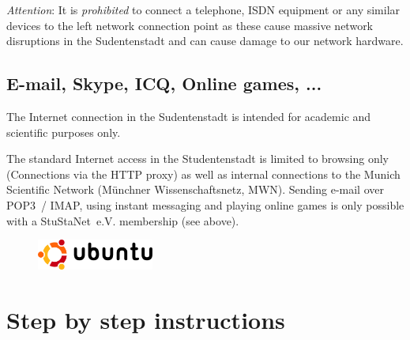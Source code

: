 \documentclass[a4paper,12pt]{scrartcl}
\begin{document}
\emph{Attention}: It is \emph{prohibited} to connect a telephone, ISDN equipment or any similar devices to the left network connection point as these cause massive network disruptions in the Sudentenstadt and can cause damage to our network hardware.

\subsection*{E-mail, Skype, ICQ, Online games, ...}

The Internet connection in the Sudentenstadt is intended for academic and scientific purposes only.

The standard Internet access in the Studentenstadt is limited to browsing only (Connections via the HTTP proxy) as well as internal connections to the Munich Scientific Network (Münchner Wissenschaftsnetz, MWN). Sending e-mail over POP3~/ IMAP, using instant messaging and playing online games is only possible with a StuStaNet~e.V. membership (see above).


\newpage

\begin{figure}[t!]
    \raggedleft
    \vspace{-20pt}
    \includegraphics[height=1cm,keepaspectratio]{Bilder/Ubuntu_logo}
    \vspace{-30pt}
\end{figure}

\section*{Step by step instructions}
\end{document}
